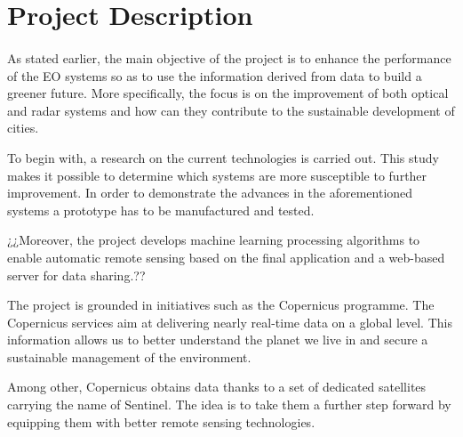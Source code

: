 \section{Project Description}
\paragraph{}As stated earlier, the main objective of the project is to enhance the performance of the EO systems so as to use the information derived from data to build a greener future. More specifically, the focus is on the improvement of both optical and radar systems and how can they contribute to the sustainable development of cities. 

To begin with, a research on the current technologies is carried out. This study makes it possible to determine which systems are more susceptible to further improvement. In order to demonstrate the advances in the aforementioned systems a prototype has to be manufactured and tested. 

¿¿Moreover, the project develops machine learning processing algorithms to enable automatic remote sensing based on the final application and a web-based server for data sharing.??

The project is grounded in initiatives such as the Copernicus programme. The Copernicus services aim at delivering nearly real-time data on a global level. This information allows us to better understand the planet we live in and secure a sustainable management of the environment.

Among other, Copernicus obtains data thanks to a set of dedicated satellites carrying the name of Sentinel. The idea is to take them a further step forward by equipping them with better remote sensing technologies. 
